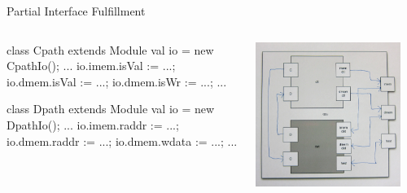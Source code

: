 \documentclass[xcolor=pdflatex,dvipsnames,table]{beamer}
\begin{document}
\begin{frame}[fragile]{Partial Interface Fulfillment}
\begin{columns}

\begin{scala}
class Cpath extends Module {
  val io = new CpathIo();
  ...
  io.imem.isVal := ...;
  io.dmem.isVal := ...;
  io.dmem.isWr  := ...;
  ...
}

class Dpath extends Module {
  val io = new DpathIo();
  ...
  io.imem.raddr := ...;
  io.dmem.raddr := ...;
  io.dmem.wdata := ...;
  ...
}
\end{scala}


\begin{center}
\includegraphics[width=0.9\textwidth]{../tutorial/figs/cpu.png} 
\end{center}

\end{columns}
\end{frame}
\end{document}
